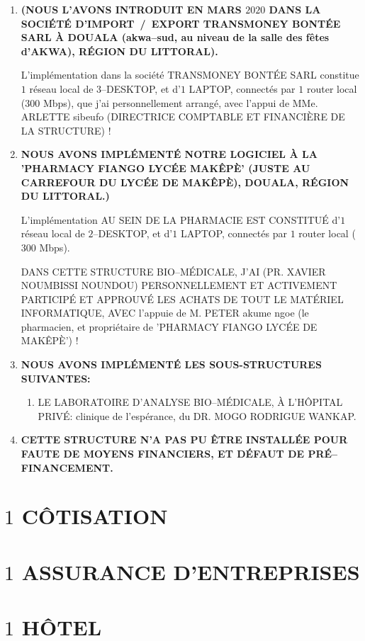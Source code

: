 \begin{enumerate}[1.]
	\itemsep 0.75em
	\item {}
	 
		\textbf{(NOUS L'AVONS INTRODUIT EN MARS $2020$ DANS
		LA SOCI\'ET\'E D'IMPORT~/~EXPORT TRANSMONEY BONT\'EE SARL
		\`A DOUALA (akwa--sud, au niveau de la salle des f\^etes
		d'AKWA), R\'EGION DU LITTORAL).}
		
		L'implémentation dans la société TRANSMONEY BONTÉE SARL
		constitue $1$ réseau local de $3$--DESKTOP, et d'$1$ LAPTOP,
		connectés par $1$ router local ($300$ Mbps), que j'ai personnellement
		arrangé, avec l'appui de MMe. ARLETTE sibeufo (DIRECTRICE COMPTABLE
		ET FINANCIÈRE DE LA STRUCTURE) !
				
	\item {}
	
		\textbf{NOUS AVONS IMPL\'EMENT\'E NOTRE LOGICIEL \`A LA
		'PHARMACY FIANGO LYC\'EE MAK\^EP\`E' (JUSTE AU CARREFOUR
		DU LYC\'EE DE MAK\^EP\`E), DOUALA, R\'EGION DU LITTORAL.)}
		
		L'implémentation AU SEIN DE LA PHARMACIE EST CONSTITUÉ
		d'$1$ réseau local de $2$--DESKTOP, et d'$1$ LAPTOP,
		connectés par $1$ router local ($300$ Mbps).
		
		DANS CETTE STRUCTURE BIO--MÉDICALE, J'AI (PR. XAVIER NOUMBISSI
		NOUNDOU) PERSONNELLEMENT ET ACTIVEMENT PARTICIPÉ ET APPROUVÉ
		LES ACHATS DE TOUT LE MATÉRIEL INFORMATIQUE, AVEC l'appuie
		de M. PETER akume ngoe (le pharmacien, et propriétaire de
		'PHARMACY FIANGO LYCÉE DE MAKÊPÈ') !

	\item {}
	
		\textbf{NOUS AVONS IMPLÉMENTÉ LES SOUS-STRUCTURES SUIVANTES:}
		\begin{enumerate}[1.]
				\item LE LABORATOIRE D'ANALYSE BIO--MÉDICALE, À
				L'HÔPITAL PRIVÉ: clinique de l'espérance, du 
				DR. MOGO RODRIGUE WANKAP.
		\end{enumerate}

	\item {}	
	
		\textbf{CETTE STRUCTURE N'A PAS PU ÊTRE INSTALLÉE POUR
		FAUTE DE MOYENS FINANCIERS, ET DÉFAUT DE PRÉ--FINANCEMENT.}
	
\end{enumerate}



\section{$1$ CÔTISATION}



\section{$1$ ASSURANCE D'ENTREPRISES}



\section{$1$ HÔTEL}


